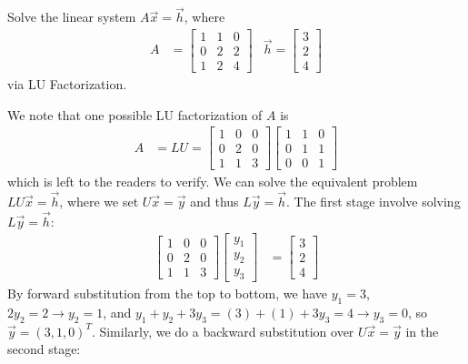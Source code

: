 \begin{exmp}
Solve the linear system $A\vec{x} = \vec{h}$, where
\begin{align*}
A &= 
\begin{bmatrix}
1 & 1 & 0 \\
0 & 2 & 2 \\
1 & 2 & 4 
\end{bmatrix}
& \vec{h} = 
\begin{bmatrix}
3 \\
2 \\
4
\end{bmatrix}
\end{align*}
via LU Factorization.
\end{exmp}
\begin{solution}
We note that one possible LU factorization of $A$ is
\begin{align*}
A &= LU = 
\begin{bmatrix}
1 & 0 & 0 \\
0 & 2 & 0 \\
1 & 1 & 3 
\end{bmatrix}
\begin{bmatrix}
1 & 1 & 0 \\
0 & 1 & 1 \\
0 & 0 & 1 
\end{bmatrix}
\end{align*}
which is left to the readers to verify. We can solve the equivalent problem $LU\vec{x} = \vec{h}$, where we set $U\vec{x} = \vec{y}$ and thus $L\vec{y} = \vec{h}$. The first stage involve solving $L\vec{y} = \vec{h}$:
\begin{align*}
\begin{bmatrix}
1 & 0 & 0 \\
0 & 2 & 0 \\
1 & 1 & 3 
\end{bmatrix}
\begin{bmatrix}
y_1 \\
y_2 \\
y_3
\end{bmatrix}
&=
\begin{bmatrix}
3 \\
2 \\
4
\end{bmatrix}
\end{align*}
By forward substitution from the top to bottom, we have $y_1 = 3$, $2y_2 = 2 \to y_2 = 1$, and $y_1 + y_2 + 3y_3 = (3) + (1) + 3y_3 = 4 \to y_3 = 0$, so $\vec{y} = (3,1,0)^T$. Similarly, we do a backward substitution over $U\vec{x} = \vec{y}$ in the second stage:

\end{solution}
